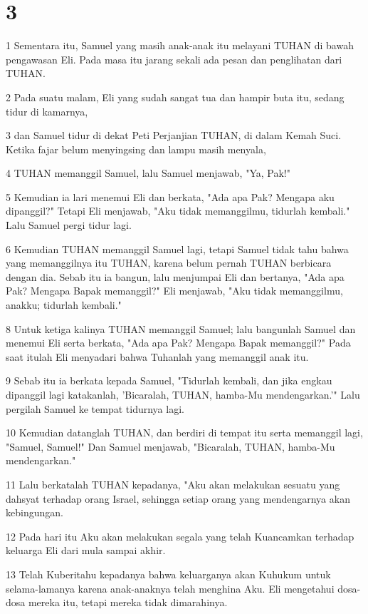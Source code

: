 \chapter{3}

\par 1 Sementara itu, Samuel yang masih anak-anak itu melayani TUHAN di bawah pengawasan Eli. Pada masa itu jarang sekali ada pesan dan penglihatan dari TUHAN.
\par 2 Pada suatu malam, Eli yang sudah sangat tua dan hampir buta itu, sedang tidur di kamarnya,
\par 3 dan Samuel tidur di dekat Peti Perjanjian TUHAN, di dalam Kemah Suci. Ketika fajar belum menyingsing dan lampu masih menyala,
\par 4 TUHAN memanggil Samuel, lalu Samuel menjawab, "Ya, Pak!"
\par 5 Kemudian ia lari menemui Eli dan berkata, "Ada apa Pak? Mengapa aku dipanggil?" Tetapi Eli menjawab, "Aku tidak memanggilmu, tidurlah kembali." Lalu Samuel pergi tidur lagi.
\par 6 Kemudian TUHAN memanggil Samuel lagi, tetapi Samuel tidak tahu bahwa yang memanggilnya itu TUHAN, karena belum pernah TUHAN berbicara dengan dia. Sebab itu ia bangun, lalu menjumpai Eli dan bertanya, "Ada apa Pak? Mengapa Bapak memanggil?" Eli menjawab, "Aku tidak memanggilmu, anakku; tidurlah kembali."
\par 8 Untuk ketiga kalinya TUHAN memanggil Samuel; lalu bangunlah Samuel dan menemui Eli serta berkata, "Ada apa Pak? Mengapa Bapak memanggil?" Pada saat itulah Eli menyadari bahwa Tuhanlah yang memanggil anak itu.
\par 9 Sebab itu ia berkata kepada Samuel, "Tidurlah kembali, dan jika engkau dipanggil lagi katakanlah, 'Bicaralah, TUHAN, hamba-Mu mendengarkan.'" Lalu pergilah Samuel ke tempat tidurnya lagi.
\par 10 Kemudian datanglah TUHAN, dan berdiri di tempat itu serta memanggil lagi, "Samuel, Samuel!" Dan Samuel menjawab, "Bicaralah, TUHAN, hamba-Mu mendengarkan."
\par 11 Lalu berkatalah TUHAN kepadanya, "Aku akan melakukan sesuatu yang dahsyat terhadap orang Israel, sehingga setiap orang yang mendengarnya akan kebingungan.
\par 12 Pada hari itu Aku akan melakukan segala yang telah Kuancamkan terhadap keluarga Eli dari mula sampai akhir.
\par 13 Telah Kuberitahu kepadanya bahwa keluarganya akan Kuhukum untuk selama-lamanya karena anak-anaknya telah menghina Aku. Eli mengetahui dosa-dosa mereka itu, tetapi mereka tidak dimarahinya.
